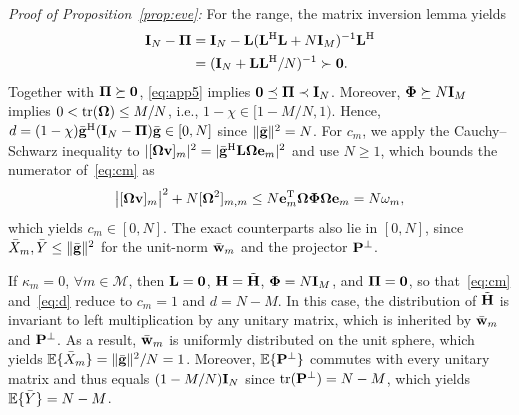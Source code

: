 \documentclass[journal]{IEEEtran}
\begin{document}
\textit{Proof of Proposition~\ref{prop:eve}:} For the range, the matrix inversion lemma yields
\begin{equation}\label{eq:app5}
\begin{aligned}\mathbf{I}_N-\boldsymbol{\Pi}&=\mathbf{I}_N-\mathbf{L}(\mathbf{L}^{\mathrm H}\mathbf{L}+N\mathbf{I}_M)^{-1}\mathbf{L}^{\mathrm H}\\&=(\mathbf{I}_N+\mathbf{L}\mathbf{L}^{\mathrm H}/N)^{-1}\succ\mathbf 0.\end{aligned}
\end{equation}
Together with $\boldsymbol{\Pi}\succeq\mathbf 0$, \eqref{eq:app5} implies $\mathbf 0\preceq\boldsymbol{\Pi}\prec\mathbf{I}_N$. Moreover, $\boldsymbol{\Phi}\succeq N\mathbf{I}_M$ implies $0<\mathrm{tr}(\boldsymbol{\Omega})\le M/N$, i.e., $1-\chi\in[1-M/N,1)$. Hence, $d=(1-\chi)\bar{\mathbf{g}}^{\mathrm H}(\mathbf{I}_N-\boldsymbol{\Pi})\bar{\mathbf{g}}\in[0,N]$ since $\|\bar{\mathbf{g}}\|^2=N$. For $c_m$, we apply the Cauchy--Schwarz inequality to $|[\boldsymbol{\Omega}\mathbf{v}]_m|^2=|\bar{\mathbf{g}}^{\mathrm H}\mathbf{L}\boldsymbol{\Omega}\mathbf{e}_m|^2$ and use $N\ge1$, which bounds the numerator of~\eqref{eq:cm} as
\begin{equation}\label{eq:app6}
\big|[\boldsymbol{\Omega}\mathbf{v}]_m\big|^2+N[\boldsymbol{\Omega}^2]_{m,m}\le N\mathbf{e}_m^{\mathrm T}\boldsymbol{\Omega}\boldsymbol{\Phi}\boldsymbol{\Omega}\mathbf{e}_m=N\omega_m,
\end{equation}
which yields $c_m\in[0,N]$. The exact counterparts also lie in $[0,N]$, since $\bar X_m,\bar Y\le\|\bar{\mathbf{g}}\|^2$ for the unit-norm $\bar{\mathbf{w}}_m$ and the projector $\mathbf{P}^{\perp}$.

If $\kappa_m=0$, $\forall m\in\mathcal M$, then $\mathbf{L}=\mathbf 0$, $\mathbf{H}=\tilde{\mathbf{H}}$, $\boldsymbol{\Phi}=N\mathbf{I}_M$, and $\boldsymbol{\Pi}=\mathbf 0$, so that~\eqref{eq:cm} and~\eqref{eq:d} reduce to $c_m=1$ and $d=N-M$. In this case, the distribution of $\tilde{\mathbf{H}}$ is invariant to left multiplication by any unitary matrix, which is inherited by $\bar{\mathbf{w}}_m$ and $\mathbf{P}^{\perp}$. As a result, $\bar{\mathbf{w}}_m$ is uniformly distributed on the unit sphere, which yields $\mathbb{E}\{\bar X_m\}=\|\bar{\mathbf{g}}\|^2/N=1$. Moreover, $\mathbb{E}\{\mathbf{P}^{\perp}\}$ commutes with every unitary matrix and thus equals $(1-M/N)\mathbf{I}_N$ since $\mathrm{tr}(\mathbf{P}^{\perp})=N-M$, which yields $\mathbb{E}\{\bar Y\}=N-M$.
\end{document}
